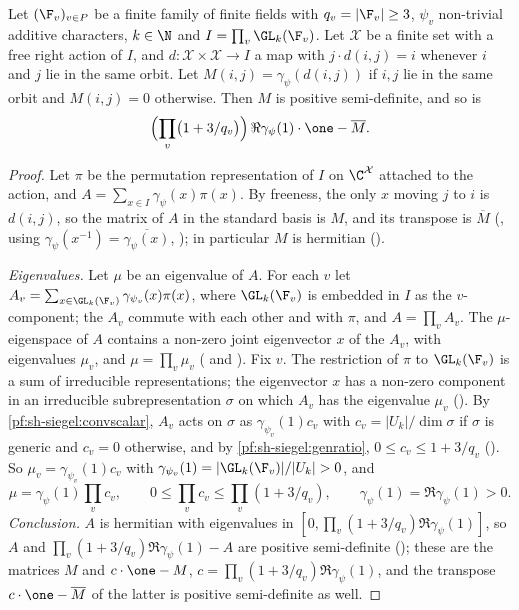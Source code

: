 \begin{theorem}\label{pf:sh-siegel:ggmatrix}
Let $(\F_v)_{v\in P}$ be a finite family of finite fields with $q_v=|\F_v|\ge3$, $\psi_v$ non-trivial additive characters,
$k\in\N$ and $I=\prod_v\GL_k(\F_v)$. Let $\mathcal X$ be a finite set with a free right action of $I$, and
$d\colon\mathcal X\times\mathcal X\to I$ a map with $j\cdot d(i,j)=i$ whenever $i$ and $j$ lie in the same orbit. Let
$M(i,j)=\gamma_\psi(d(i,j))$ if $i,j$ lie in the same orbit and $M(i,j)=0$ otherwise. Then $M$ is positive semi-definite,
and so is
\[
\Bigl(\prod_v\bigl(1+3/q_v\bigr)\Bigr)\,\Re\gamma_\psi(1)\cdot\one-\overline M .
\]
\end{theorem}

\begin{proof}
Let $\pi$ be the permutation representation of $I$ on $\C^{\mathcal X}$ attached to the action, and
$A=\sum_{x\in I}\gamma_\psi(x)\pi(x)$. By freeness, the only $x$ moving $j$ to $i$ is $d(i,j)$, so the matrix of $A$ in the
standard basis is $M$, and its transpose is $\overline M$ (, using
$\gamma_\psi(x^{-1})=\overline{\gamma_\psi(x)}$, ); in particular $M$ is hermitian
().

\emph{Eigenvalues.} Let $\mu$ be an eigenvalue of $A$. For each $v$ let $A_v=\sum_{x\in\GL_k(\F_v)}\gamma_{\psi_v}(x)\pi(x)$,
where $\GL_k(\F_v)$ is embedded in $I$ as the $v$-component; the $A_v$ commute with each other and with $\pi$, and
$A=\prod_vA_v$. The $\mu$-eigenspace of $A$ contains a non-zero joint eigenvector $x$ of the $A_v$, with eigenvalues $\mu_v$,
and $\mu=\prod_v\mu_v$ ( and ). Fix $v$.
The restriction of $\pi$ to $\GL_k(\F_v)$ is a sum of irreducible representations; the eigenvector $x$ has a non-zero
component in an irreducible subrepresentation $\sigma$ on which $A_v$ has the eigenvalue $\mu_v$
(). By \cref{pf:sh-siegel:convscalar}, $A_v$ acts on $\sigma$ as
$\gamma_{\psi_v}(1)c_v$ with $c_v=|U_k|/\dim\sigma$ if $\sigma$ is generic and $c_v=0$ otherwise, and by
\cref{pf:sh-siegel:genratio}, $0\le c_v\le1+3/q_v$ (). So $\mu_v=\gamma_{\psi_v}(1)c_v$
with $\gamma_{\psi_v}(1)=|\GL_k(\F_v)|/|U_k|>0$, and
\[
\mu=\gamma_\psi(1)\prod_vc_v,\qquad0\le\prod_vc_v\le\prod_v(1+3/q_v),\qquad\gamma_\psi(1)=\Re\gamma_\psi(1)>0 .
\]
\emph{Conclusion.} $A$ is hermitian with eigenvalues in $[0,\prod_v(1+3/q_v)\Re\gamma_\psi(1)]$, so $A$ and
$\prod_v(1+3/q_v)\Re\gamma_\psi(1)-A$ are positive semi-definite ();
these are the matrices $M$ and $c\cdot\one-M$, $c=\prod_v(1+3/q_v)\Re\gamma_\psi(1)$, and the transpose $c\cdot\one-\overline M$ of
the latter is positive semi-definite as well.
\end{proof}

